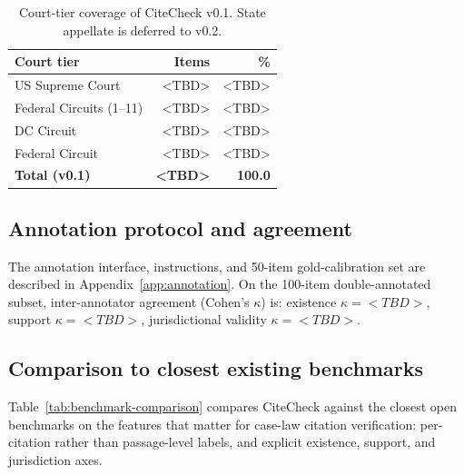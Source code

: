 \documentclass[11pt]{article}
\begin{document}
\begin{table}[t]
\centering
\small
\begin{tabular}{lrr}
\toprule
\textbf{Court tier} & \textbf{Items} & \textbf{\%} \\
\midrule
US Supreme Court            & <TBD> & <TBD> \\
Federal Circuits (1--11)    & <TBD> & <TBD> \\
DC Circuit                  & <TBD> & <TBD> \\
Federal Circuit             & <TBD> & <TBD> \\
\midrule
\textbf{Total (v0.1)}       & \textbf{<TBD>} & \textbf{100.0} \\
\bottomrule
\end{tabular}
\caption{Court-tier coverage of CiteCheck v0.1. State appellate is
deferred to v0.2.}
\label{tab:coverage}
\end{table}

\subsection{Annotation protocol and agreement}
\label{sec:benchmark:annotation}

The annotation interface, instructions, and 50-item gold-calibration
set are described in Appendix~\ref{app:annotation}. On the 100-item
double-annotated subset, inter-annotator agreement (Cohen's $\kappa$)
is: existence $\kappa = <TBD>$, support $\kappa = <TBD>$,
jurisdictional validity $\kappa = <TBD>$.

\subsection{Comparison to closest existing benchmarks}
\label{sec:benchmark:comparison}

Table~\ref{tab:benchmark-comparison} compares CiteCheck against the
closest open benchmarks on the features that matter for case-law
citation verification: per-citation rather than passage-level labels,
and explicit existence, support, and jurisdiction axes.
\end{document}
